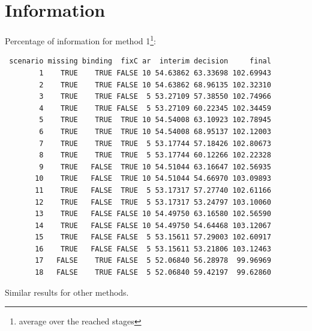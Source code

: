 \documentclass[12pt]{article}
\begin{document}
\clearpage

\section{Information}
\label{sec:orgf359143}

Percentage of information for method 1\footnote{average over the reached stages}:
\begin{verbatim}
 scenario missing binding  fixC ar  interim decision     final
        1    TRUE    TRUE FALSE 10 54.63862 63.33698 102.69943
        2    TRUE    TRUE FALSE 10 54.63862 68.96135 102.32310
        3    TRUE    TRUE FALSE  5 53.27109 57.38550 102.74966
        4    TRUE    TRUE FALSE  5 53.27109 60.22345 102.34459
        5    TRUE    TRUE  TRUE 10 54.54008 63.10923 102.78945
        6    TRUE    TRUE  TRUE 10 54.54008 68.95137 102.12003
        7    TRUE    TRUE  TRUE  5 53.17744 57.18426 102.80673
        8    TRUE    TRUE  TRUE  5 53.17744 60.12266 102.22328
        9    TRUE   FALSE  TRUE 10 54.51044 63.16647 102.56935
       10    TRUE   FALSE  TRUE 10 54.51044 54.66970 103.09893
       11    TRUE   FALSE  TRUE  5 53.17317 57.27740 102.61166
       12    TRUE   FALSE  TRUE  5 53.17317 53.24797 103.10060
       13    TRUE   FALSE FALSE 10 54.49750 63.16580 102.56590
       14    TRUE   FALSE FALSE 10 54.49750 54.64468 103.12067
       15    TRUE   FALSE FALSE  5 53.15611 57.29003 102.60917
       16    TRUE   FALSE FALSE  5 53.15611 53.21806 103.12463
       17   FALSE    TRUE FALSE  5 52.06840 56.28978  99.96969
       18   FALSE    TRUE FALSE  5 52.06840 59.42197  99.62860
\end{verbatim}

Similar results for other methods.
\end{document}
